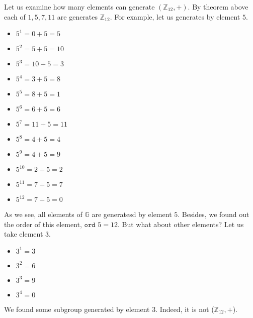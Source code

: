 \documentclass[../lecture-notes-148x210.tex]{subfiles}
\begin{document}
\begin{example}
    Let us examine how many elements can generate $(\mathbb{Z}_{12}, +)$. By theorem above 
    each of $1, 5, 7, 11$ are generates $\mathbb{Z}_{12}$. For example, let us generates by 
    element $5$.
    \begin{xmulticols}{3}
        \begin{itemize}
            \item $5^{1} = 0 + 5 = 5$
            \item $5^{2} = 5 + 5 = 10$
            \item $5^{3} = 10 + 5 = 3$
            \item $5^{4} = 3  + 5 = 8$
            
            \item $5^{5} = 8 + 5 = 1$
            \item $5^{6} = 6 + 5 = 6$
            \item $5^{7} = 11 + 5 = 11$
            \item $5^{8} = 4 + 5 = 4$
            
            \item $5^{9} = 4 + 5= 9$
            \item $5^{10} = 2 + 5 = 2$
            \item $5^{11} = 7 + 5 = 7$
            \item $5^{12} = 7 + 5 = 0$
        \end{itemize}        
    \end{xmulticols}

    As we see, all elements of $\mathbb{G}$ are generatesd by element $5$. 
    Besides, we found out the order of this element, $\texttt{ord } 5 = 12$.
    But what about other elements? Let us take element $3$.

    \begin{xmulticols}{4}
        \begin{itemize}
            \item $3^{1} = 3$
            \item $3^{2} = 6$
            \item $3^{3} = 9$
            \item $3^{4} = 0$
        \end{itemize}
    \end{xmulticols} 

    We found some subgroup generated by element $3$. Indeed, it is not ($\mathbb{Z}_{12}, +$).
\end{example}
\end{document}
